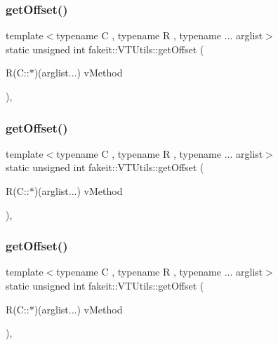 \mbox{\label{classfakeit_1_1VTUtils_a0e019646d770355889228b1d88675530}} 
\subsubsection{\texorpdfstring{getOffset()}{getOffset()}\hspace{0.1cm}{\footnotesize\ttfamily [5/9]}}
{\footnotesize\ttfamily template$<$typename C , typename R , typename ... arglist$>$ \\
static unsigned int fakeit\+::\+V\+T\+Utils\+::get\+Offset (\begin{DoxyParamCaption}\item[{R(C\+::$\ast$)(arglist...)}]{v\+Method }\end{DoxyParamCaption})\hspace{0.3cm}{\ttfamily [inline]}, {\ttfamily [static]}}

\mbox{\label{classfakeit_1_1VTUtils_a0e019646d770355889228b1d88675530}} 
\subsubsection{\texorpdfstring{getOffset()}{getOffset()}\hspace{0.1cm}{\footnotesize\ttfamily [6/9]}}
{\footnotesize\ttfamily template$<$typename C , typename R , typename ... arglist$>$ \\
static unsigned int fakeit\+::\+V\+T\+Utils\+::get\+Offset (\begin{DoxyParamCaption}\item[{R(C\+::$\ast$)(arglist...)}]{v\+Method }\end{DoxyParamCaption})\hspace{0.3cm}{\ttfamily [inline]}, {\ttfamily [static]}}

\mbox{\label{classfakeit_1_1VTUtils_a0e019646d770355889228b1d88675530}} 
\subsubsection{\texorpdfstring{getOffset()}{getOffset()}\hspace{0.1cm}{\footnotesize\ttfamily [7/9]}}
{\footnotesize\ttfamily template$<$typename C , typename R , typename ... arglist$>$ \\
static unsigned int fakeit\+::\+V\+T\+Utils\+::get\+Offset (\begin{DoxyParamCaption}\item[{R(C\+::$\ast$)(arglist...)}]{v\+Method }\end{DoxyParamCaption})\hspace{0.3cm}{\ttfamily [inline]}, {\ttfamily [static]}}

